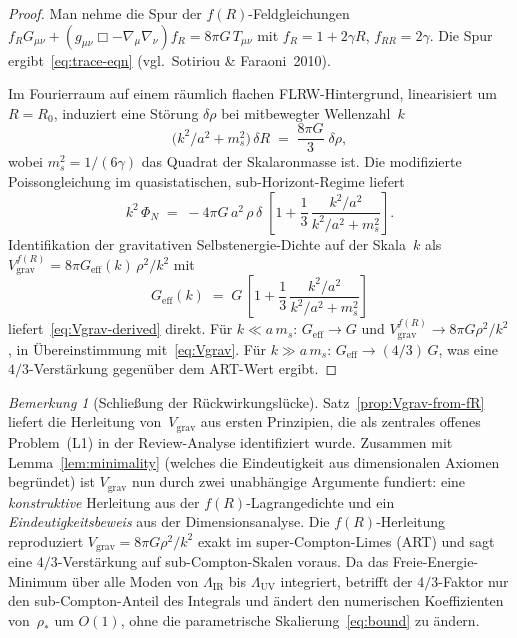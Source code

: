 \documentclass[12pt,a4paper]{article}
\theoremstyle{definition}
\theoremstyle{plain}
\theoremstyle{remark}
\newtheorem{remark}[definition]{Bemerkung}
\newcommand{\LUV}{\Lambda_{\mathrm{UV}}}
\newcommand{\LIR}{\Lambda_{\mathrm{IR}}}
\begin{document}
\begin{proof}
Man nehme die Spur der $f(R)$-Feldgleichungen
$f_R G_{\mu\nu} + (g_{\mu\nu}\Box - \nabla_\mu\nabla_\nu)f_R
= 8\pi G\,T_{\mu\nu}$ mit $f_R = 1 + 2\gamma R$, $f_{RR} = 2\gamma$.
Die Spur ergibt~\eqref{eq:trace-eqn} (vgl.~Sotiriou \&
Faraoni~2010).

Im Fourierraum auf einem r\"aumlich flachen FLRW-Hintergrund, linearisiert
um $R = R_0$, induziert eine St\"orung $\delta\rho$ bei mitbewegter
Wellenzahl~$k$
\[
  \bigl(k^2/a^2 + m_s^2\bigr)\,\delta R
  \;=\; \frac{8\pi G}{3}\;\delta\rho,
\]
wobei $m_s^2 = 1/(6\gamma)$ das Quadrat der Skalaronmasse ist. Die
modifizierte Poissongleichung im quasistatischen, sub-Horizont-Regime
liefert~\cite{HuSawicki2007}
\[
  k^2\,\Phi_N \;=\; -4\pi G\,a^2\,\rho\,\delta
  \;\left[1 + \frac{1}{3}\,\frac{k^2/a^2}{k^2/a^2 + m_s^2}\right].
\]
Identifikation der gravitativen Selbstenergie-Dichte auf der Skala~$k$
als $V_{\mathrm{grav}}^{f(R)} = 8\pi G_{\mathrm{eff}}(k)\,\rho^2/k^2$
mit
\[
  G_{\mathrm{eff}}(k) \;=\; G\,\left[1 + \frac{1}{3}\,
  \frac{k^2/a^2}{k^2/a^2 + m_s^2}\right]
\]
liefert~\eqref{eq:Vgrav-derived} direkt.
F\"ur $k \ll a\,m_s$: $G_{\mathrm{eff}} \to G$ und
$V_{\mathrm{grav}}^{f(R)} \to 8\pi G\rho^2/k^2$, in
\"Ubereinstimmung mit~\eqref{eq:Vgrav}.
F\"ur $k \gg a\,m_s$: $G_{\mathrm{eff}} \to (4/3)\,G$, was eine
$4/3$-Verst\"arkung gegen\"uber dem ART-Wert ergibt.
\end{proof}

\begin{remark}[Schlie\ss ung der R\"uckwirkungsl\"ucke]
Satz~\ref{prop:Vgrav-from-fR} liefert die Herleitung
von~$V_{\mathrm{grav}}$ aus ersten Prinzipien, die als zentrales
offenes Problem~(L1) in der Review-Analyse identifiziert wurde.
Zusammen mit Lemma~\ref{lem:minimality} (welches die Eindeutigkeit aus
dimensionalen Axiomen begr\"undet) ist $V_{\mathrm{grav}}$ nun durch zwei
unabh\"angige Argumente fundiert: eine \emph{konstruktive} Herleitung aus
der $f(R)$-Lagrangedichte und ein \emph{Eindeutigkeitsbeweis} aus der
Dimensionsanalyse. Die $f(R)$-Herleitung reproduziert
$V_{\mathrm{grav}} = 8\pi G\rho^2/k^2$ exakt im super-Compton-Limes
(ART) und sagt eine $4/3$-Verst\"arkung auf sub-Compton-Skalen voraus.
Da das Freie-Energie-Minimum \"uber alle Moden von $\LIR$ bis $\LUV$
integriert, betrifft der $4/3$-Faktor nur den sub-Compton-Anteil des
Integrals und \"andert den numerischen Koeffizienten von~$\rho_\ast$
um $O(1)$, ohne die parametrische Skalierung~\eqref{eq:bound} zu
\"andern.
\end{remark}
\end{document}
